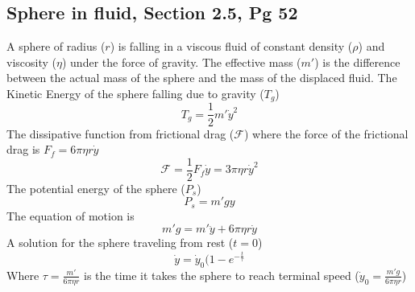\documentclass[12pt]{article}
\begin{document}
    \subsection{Sphere in fluid, Section 2.5, Pg 52}
    A sphere of radius ($r$) is falling in a viscous fluid of constant density ($\rho$) and viscosity ($\eta$) under the force of gravity. The effective mass ($m'$) is the difference between the actual mass of the sphere and the mass of the displaced fluid. 
    \newline The Kinetic Energy of the sphere falling due to gravity ($T_g$)
    \begin{equation}
        T_g = \frac{1}{2} m' \dot{y}^2
    \end{equation}
    The dissipative function from frictional drag ($\mathcal{F}$) where the force of the frictional drag is $F_f = 6 \pi \eta r \dot{y}$
    \begin{equation}
        \mathcal{F} = \frac{1}{2} F_f \dot{y} = 3 \pi \eta r \dot{y}^2
    \end{equation}
    The potential energy of the sphere ($P_s$)
    \begin{equation}
        P_s = m' g y
    \end{equation}
    The equation of motion is 
    \begin{equation}
        m' g = m' \ddot{y} + 6 \pi \eta r \dot{y}
    \end{equation}
    A solution for the sphere traveling from rest ($t=0$)
    \begin{equation}
        \dot{y} = \dot{y}_0 (1 - e^{-\frac{t}{\tau}}
    \end{equation}
    Where $\tau = \frac{m'}{6 \pi \eta r}$ is the time it takes the sphere to reach terminal speed ($\dot{y}_0 = \frac{m' g}{6 \pi \eta r}$)
\end{document}
